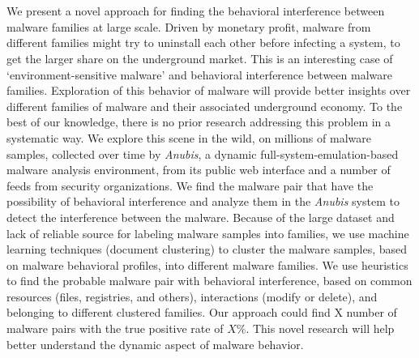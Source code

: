 \chapter{\abstractname}
We present a novel approach for finding the behavioral interference between malware families at large scale.
Driven by monetary profit, malware from different families might try to uninstall each other before infecting a system, to get the larger share on the underground market.
This is an interesting case of `environment-sensitive malware' and behavioral interference between malware families.
Exploration of this behavior of malware will provide better insights over different families of malware and their associated underground economy.
To the best of our knowledge, there is no prior research addressing this problem in a systematic way.
We explore this scene in the wild, on millions of malware samples, collected over time by \emph{Anubis}, a dynamic full-system-emulation-based malware analysis environment, from its public web interface and a number of feeds from security organizations.
We find the malware pair that have the possibility of behavioral interference and analyze them in the \emph{Anubis} system to detect the interference between the malware.
Because of the large dataset and lack of reliable source for labeling malware samples into families, we use machine learning techniques (document clustering) to cluster the malware samples, based on malware behavioral profiles, into different malware families.
We use heuristics to find the probable malware pair with behavioral interference, based on common resources (files, registries, and others), interactions (modify or delete), and belonging to different clustered families.
Our approach could find X number of malware pairs with the true positive rate of $X\%$.
This novel research will help better understand the dynamic aspect of malware behavior.

